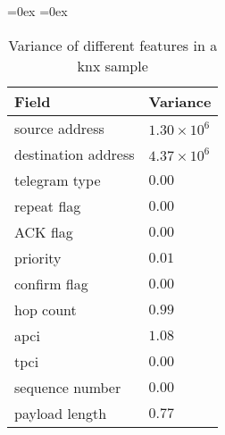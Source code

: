 
\begin{wraptable}{r}{0.5\textwidth}
	\aboverulesep=0ex
	\belowrulesep=0ex
	\renewcommand{\arraystretch}{1.2}
	
	\centering
	\begin{tabularx}{0.5\textwidth}{|l|Z|}
		\toprule
		\textbf{Field} & \textbf{Variance} \\\midrule
		source address & $1.30 \times 10^6$ \\
		destination address & $4.37 \times 10^6$ \\
		telegram type & $0.00$ \\
		repeat flag & $0.00$ \\
		ACK flag & $0.00$ \\
		priority & $0.01$ \\
		confirm flag & $0.00$ \\
		hop count & $0.99$ \\
		\gls{apci} & $1.08$ \\
		\gls{tpci} & $0.00$ \\
		sequence number & $0.00$ \\
		payload length & $0.77$ \\
		\bottomrule
	\end{tabularx}
	\caption[Variance of different features in a KNX sample]{Variance of different features in a \gls{knx} sample }
	\label{tab:concept:anal:feature-vector:var}
\end{wraptable}